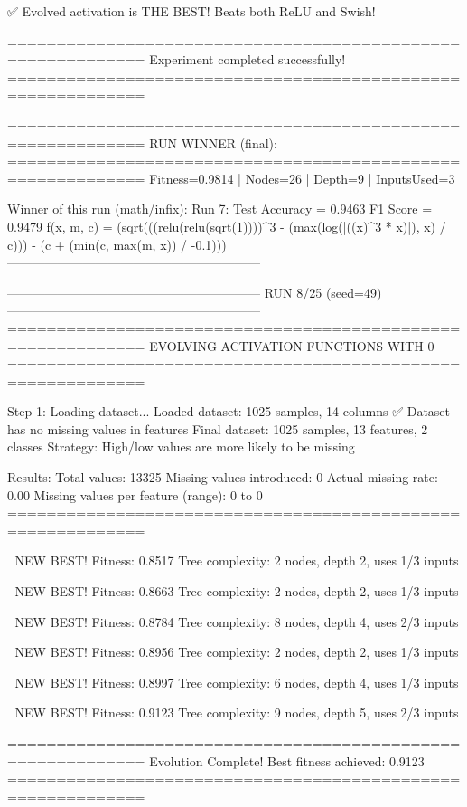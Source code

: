 ✅ Evolved activation is THE BEST! Beats both ReLU and Swish!

============================================================
Experiment completed successfully!
============================================================

============================================================
RUN WINNER (final):
============================================================
Fitness=0.9814 | Nodes=26 | Depth=9 | InputsUsed=3

Winner of this run (math/infix):
  Run 7:
     Test Accuracy = 0.9463
     F1 Score      = 0.9479
     f(x, m, c)    = (sqrt(((relu(relu(sqrt(1))))^3 - (max(log(|((x)^3 * x)|), x) / c))) - (c + (min(c, max(m, x)) / -0.1)))
------------------------------------------------------------

------------------------------------------------------------
RUN 8/25 (seed=49)
------------------------------------------------------------
============================================================
EVOLVING ACTIVATION FUNCTIONS
WITH 0%
============================================================

Step 1: Loading dataset...
Loaded dataset: 1025 samples, 14 columns
✅ Dataset has no missing values in features
Final dataset: 1025 samples, 13 features, 2 classes
Strategy: High/low values are more likely to be missing

Results:
  Total values: 13325
  Missing values introduced: 0
  Actual missing rate: 0.00%
  Missing values per feature (range): 0 to 0
============================================================


🎯 NEW BEST! Fitness: 0.8517
Tree complexity: 2 nodes, depth 2, uses 1/3 inputs

🎯 NEW BEST! Fitness: 0.8663
Tree complexity: 2 nodes, depth 2, uses 1/3 inputs

🎯 NEW BEST! Fitness: 0.8784
Tree complexity: 8 nodes, depth 4, uses 2/3 inputs

🎯 NEW BEST! Fitness: 0.8956
Tree complexity: 2 nodes, depth 2, uses 1/3 inputs

🎯 NEW BEST! Fitness: 0.8997
Tree complexity: 6 nodes, depth 4, uses 1/3 inputs

🎯 NEW BEST! Fitness: 0.9123
Tree complexity: 9 nodes, depth 5, uses 2/3 inputs

============================================================
Evolution Complete!
Best fitness achieved: 0.9123
============================================================

